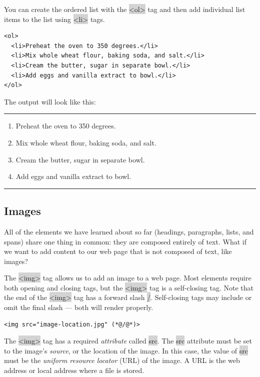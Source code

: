 \documentclass[11pt]{article}
\begin{document}
You can create the ordered list with the \colorbox{lightgray}{<ol>} tag and then add individual list items to the list using \colorbox{lightgray}{<li>} tags.
\begin{lstlisting}
<ol>
  <li>Preheat the oven to 350 degrees.</li>
  <li>Mix whole wheat flour, baking soda, and salt.</li>
  <li>Cream the butter, sugar in separate bowl.</li>
  <li>Add eggs and vanilla extract to bowl.</li>
</ol>
\end{lstlisting}
The output will look like this:
\vspace{-3mm}
\par\noindent\rule{\textwidth}{0.2pt}
\begin{enumerate}[leftmargin = 24pt]
\item Preheat the oven to 350 degrees.
\item Mix whole wheat flour, baking soda, and salt.
\item Cream the butter, sugar in separate bowl.
\item Add eggs and vanilla extract to bowl.
\end{enumerate}
\vspace{-3mm}
\par\noindent\rule{\textwidth}{0.2pt}

\subsection{Images}
All of the elements we have learned about so far (headings, paragraphs, lists, and spans) share one thing in common: they are composed entirely of text. What if we want to add content to our web page that is not composed of text, like images?

The \colorbox{lightgray}{<img>} tag allows us to add an image to a web page. Most elements require both opening and closing tags, but the \colorbox{lightgray}{<img>} tag is a self-closing tag. Note that the end of the \colorbox{lightgray}{<img>} tag has a forward slash \colorbox{lightgray}{/}. Self-closing tags may include or omit the final slash — both will render properly.
\begin{lstlisting}
<img src="image-location.jpg" (*@/@*)>
\end{lstlisting}
The \colorbox{lightgray}{<img>} tag has a required \textit{attribute} called \colorbox{lightgray}{src}. The \colorbox{lightgray}{src} attribute must be set to the image’s \textit{source}, or the location of the image. In this case, the value of \colorbox{lightgray}{src} must be the \textit{uniform resource locator} (URL) of the image. A URL is the web address or local address where a file is stored.
\end{document}
